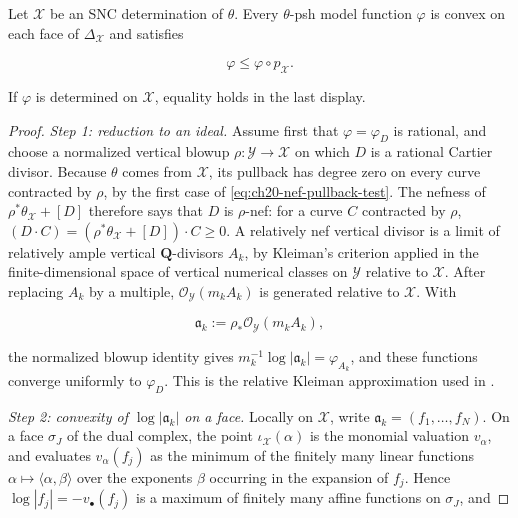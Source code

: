 \begin{lemma}\label{lem:ch21-model-skeletal-properties}
Let \(\mathcal X\) be an SNC determination of \(\theta\).  Every
\(\theta\)-psh model function \(\varphi\) is convex on each face of
\(\Delta_{\mathcal X}\) and satisfies

\[
                 \varphi\leq\varphi\circ p_{\mathcal X}.
\]

If \(\varphi\) is determined on \(\mathcal X\), equality holds in the last
display.
\end{lemma}

\begin{proof}
\emph{Step 1: reduction to an ideal.}  Assume first that
\(\varphi=\varphi_D\) is rational, and choose a normalized
vertical blowup
\(\rho:\mathcal Y\to\mathcal X\) on which \(D\) is a rational Cartier
divisor.  Because
\(\theta\) comes from \(\mathcal X\), its pullback has degree zero on every
curve contracted by \(\rho\), by the first case of
\eqref{eq:ch20-nef-pullback-test}.  The nefness of
\(\rho^*\theta_{\mathcal X}+[D]\) therefore says that \(D\) is
\(\rho\)-nef: for a curve \(C\) contracted by \(\rho\),
\((D\cdot C)=(\rho^*\theta_{\mathcal X}+[D])\cdot C\geq0\).  A relatively
nef vertical divisor is a limit of relatively
ample vertical \(\mathbf Q\)-divisors \(A_k\), by Kleiman's criterion
applied in the finite-dimensional space of vertical numerical classes on
\(\mathcal Y\) relative to \(\mathcal X\).  After
replacing \(A_k\) by a
multiple, \(\mathcal O_{\mathcal Y}(m_kA_k)\) is generated relative to
\(\mathcal X\).  With

\[
       \mathfrak a_k:=\rho_*
          \mathcal O_{\mathcal Y}(m_kA_k),
\]

the normalized blowup identity gives
\(m_k^{-1}\log|\mathfrak a_k|=\varphi_{A_k}\), and these functions converge
uniformly to \(\varphi_D\).  This is the relative Kleiman approximation used
in \cite[\S5.2]{BFJ16}.

\emph{Step 2: convexity of \(\log|\mathfrak a_k|\) on a face.}  Locally on
\(\mathcal X\), write \(\mathfrak a_k=(f_1,\ldots,f_N)\).  On a face
\(\sigma_J\) of the dual complex, the point \(\iota_{\mathcal X}(\alpha)\)
is the monomial valuation \(v_\alpha\), and
 evaluates \(v_\alpha(f_j)\) as the minimum of the
finitely many linear functions \(\alpha\mapsto\langle\alpha,\beta\rangle\)
over the exponents \(\beta\) occurring in the expansion of \(f_j\).  Hence
\(\log|f_j|=-v_\bullet(f_j)\) is a maximum of finitely many affine
functions on \(\sigma_J\), and


\end{proof}
